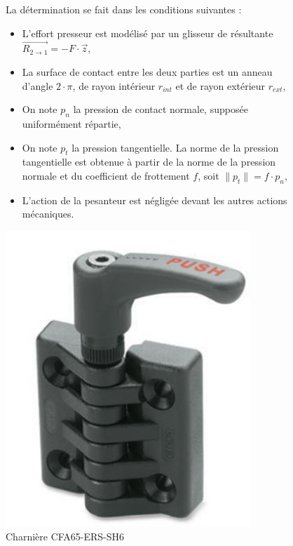 \begin{figure}[ht!]
\begin{minipage}{0.55\linewidth}
La détermination se fait dans les conditions suivantes :
\begin{itemize}
 \item L'effort presseur est modélisé par un glisseur de résultante $\overrightarrow{R_{2\rightarrow 1}}=-F\cdot \vec{z}$,
 \item La surface de contact entre les deux parties est un anneau
d'angle $2\cdot\pi$, de rayon intérieur $r_{int}$ et de rayon extérieur $r_{ext}$,
 \item On note $p_n$ la pression de contact normale, supposée uniformément répartie,
 \item On note $p_t$ la pression tangentielle. La norme de la pression tangentielle est obtenue à partir de la norme de la pression normale et du coefficient de frottement $f$, soit $\|p_t\|=f\cdot p_n$,
 \item L'action de la pesanteur est négligée devant les autres actions mécaniques.
\end{itemize}
\end{minipage}\hfill
\begin{minipage}{0.55\linewidth}
\centering\includegraphics[width=0.8\linewidth]{img/fig14}
\caption{\label{fig14}Charnière CFA65-ERS-SH6}
\end{minipage}
\end{figure}

